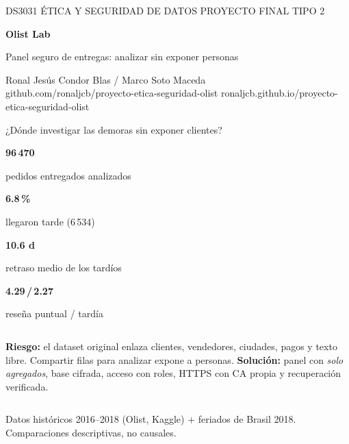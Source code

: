 \documentclass[aspectratio=169,11pt]{beamer}
\newcommand{\kpi}[2]{\begin{minipage}[t]{.23\textwidth}\color{teal}\LARGE\bfseries #1\par\scriptsize\normalfont\color{muted}#2\end{minipage}}
\begin{document}
{
\begin{frame}[plain]
\color{white}
\small DS3031 \textperiodcentered{} ÉTICA Y SEGURIDAD DE DATOS \textperiodcentered{} PROYECTO FINAL TIPO 2
\vfill
{\fontsize{35}{40}\selectfont\bfseries Olist Lab\par}
\medskip
{\Large Panel seguro de entregas: analizar sin exponer personas\par}
\vfill
\small Ronal Jesús Condor Blas \quad / \quad Marco Soto Maceda\\[2pt]
\scriptsize\color{white!70!ink} github.com/ronaljcb/proyecto-etica-seguridad-olist \quad\textperiodcentered\quad ronaljcb.github.io/proyecto-etica-seguridad-olist
\end{frame}
}

\begin{frame}{¿Dónde investigar las demoras sin exponer clientes?}
\kpi{96\,470}{pedidos entregados analizados}\hfill
\kpi{6.8\,\%}{llegaron tarde (6\,534)}\hfill
\kpi{10.6 d}{retraso medio de los tardíos}\hfill
\kpi{4.29\,/\,2.27}{reseña puntual / tardía}
\bigskip
\begin{columns}[T,onlytextwidth]
\small\textbf{Riesgo:} el dataset original enlaza clientes, vendedores, ciudades, pagos y texto libre. Compartir filas para analizar expone a personas.
\small\textbf{Solución:} panel con \emph{solo agregados}, base cifrada, acceso con roles, HTTPS con CA propia y recuperación verificada.
\end{columns}
\vfill
\scriptsize\color{muted} Datos históricos 2016--2018 (Olist, Kaggle) + feriados de Brasil 2018. Comparaciones descriptivas, no causales.
\end{frame}
\end{document}
